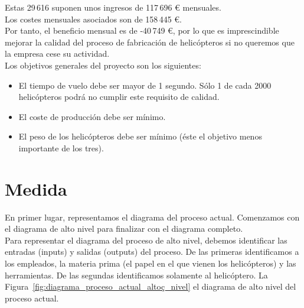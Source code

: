 \documentclass[12pt,a4paper,twoside,openright,titlepage,final]{article}
\begin{document}
Estas 29\,616 suponen unos ingresos de 117\,696 € mensuales.\\

Los costes mensuales asociados son de 158\,445 €.\\

Por tanto, el beneficio mensual es de -40\,749 €, por lo que es imprescindible mejorar la calidad del proceso de fabricación de helicópteros si no queremos que la empresa cese su actividad.\\

Los objetivos generales del proyecto son los siguientes:

\begin{itemize}
	\item El tiempo de vuelo debe ser mayor de 1 segundo. Sólo 1 de cada 2000 helicópteros podrá no cumplir este requisito de calidad.
	\item El coste de producción debe ser mínimo.
	\item El peso de los helicópteros debe ser mínimo (éste el objetivo menos importante de los tres). 
\end{itemize} 



\section{Medida}

En primer lugar, representamos el diagrama del proceso actual. Comenzamos con el diagrama de alto nivel para finalizar con el diagrama completo.\\

Para representar el diagrama del proceso de alto nivel, debemos identificar las entradas (inputs) y salidas (outputs) del proceso. De las primeras identificamos a los empleados, la materia prima (el papel en el que vienen los helicópteros) y las herramientas. De las segundas identificamos solamente al helicóptero. La Figura~\ref{fig:diagrama_proceso_actual_altoç_nivel} el diagrama de alto nivel del proceso actual.\\
\end{document}
